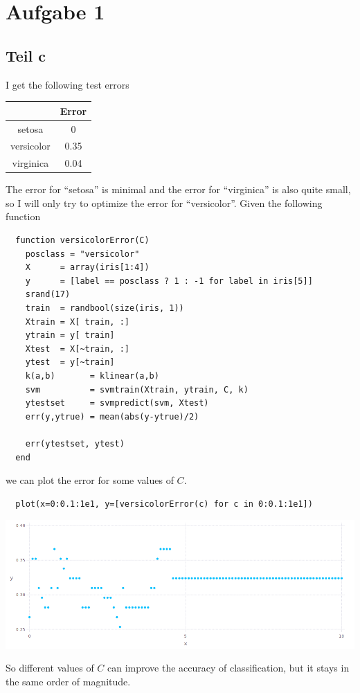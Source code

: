 \documentclass[10pt,a4paper]{article}
\begin{document}
\section{Aufgabe 1}

\subsection{Teil c}

I get the following test errors
\begin{tabular}{c|c}
  & Error\\\hline
  setosa & 0 \\\hline
  versicolor & 0.35 \\\hline
  virginica & 0.04
\end{tabular}

The error for ``setosa'' is minimal and the error for ``virginica'' is also
quite small, so I will only try to optimize the error for ``versicolor''. Given
the following function
\begin{lstlisting}
  function versicolorError(C)
    posclass = "versicolor"
    X      = array(iris[1:4])
    y      = [label == posclass ? 1 : -1 for label in iris[5]]
    srand(17)
    train  = randbool(size(iris, 1))
    Xtrain = X[ train, :]
    ytrain = y[ train]
    Xtest  = X[~train, :]
    ytest  = y[~train]
    k(a,b)       = klinear(a,b)
    svm          = svmtrain(Xtrain, ytrain, C, k)
    ytestset     = svmpredict(svm, Xtest)
    err(y,ytrue) = mean(abs(y-ytrue)/2)

    err(ytestset, ytest)
  end
\end{lstlisting}
we can plot the error for some values of $C$.
\begin{lstlisting}
  plot(x=0:0.1:1e1, y=[versicolorError(c) for c in 0:0.1:1e1])
\end{lstlisting}

\includegraphics[width=400pt]{6_1_c.png}

So different values of $C$ can improve the accuracy of classification, but it
stays in the same order of magnitude.
\end{document}
